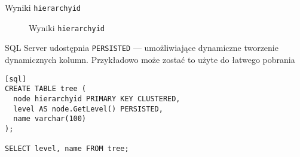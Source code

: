 










\begin{table}[h!]
  \caption{Wyniki \texttt{hierarchyid}}
  \begin{center}
  \end{center}
\end{table}

\begin{figure}[h!t]
  \caption{Wyniki \texttt{hierarchyid}}
  \label{fig:img_chart_simple}
  \begin{center}
  \end{center}
\end{figure}



SQL Server udostępnia \texttt{PERSISTED} --- umożliwiające dynamiczne tworzenie dynamicznych kolumn. 
Przykładowo może zostać to użyte do łatwego pobrania 

\begin{verbatim}[sql]
CREATE TABLE tree (
  node hierarchyid PRIMARY KEY CLUSTERED,
  level AS node.GetLevel() PERSISTED,
  name varchar(100)
);

SELECT level, name FROM tree;
\end{verbatim}










